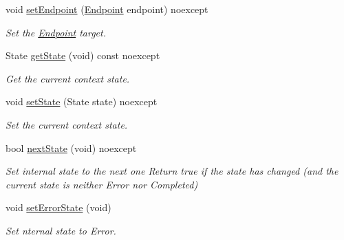 \begin{DoxyCompactItemize}
\mbox{\label{classo_z_1_1_context_ae909982a14c14b62038deff79f9151bb}} 
void \mbox{\hyperlink{classo_z_1_1_context_ae909982a14c14b62038deff79f9151bb}{set\+Endpoint}} (\mbox{\hyperlink{classo_z_1_1_endpoint}{Endpoint}} endpoint) noexcept
\begin{DoxyCompactList}\small\item\em Set the \mbox{\hyperlink{classo_z_1_1_endpoint}{Endpoint}} target. \end{DoxyCompactList}\item 
\mbox{\label{classo_z_1_1_context_af912acc5fa475aa1e835a71df1752ef5}} 
State \mbox{\hyperlink{classo_z_1_1_context_af912acc5fa475aa1e835a71df1752ef5}{get\+State}} (void) const noexcept
\begin{DoxyCompactList}\small\item\em Get the current context\textquotesingle{} state. \end{DoxyCompactList}\item 
\mbox{\label{classo_z_1_1_context_ad64db4a4b4391e8b765338cc227f948b}} 
void \mbox{\hyperlink{classo_z_1_1_context_ad64db4a4b4391e8b765338cc227f948b}{set\+State}} (State state) noexcept
\begin{DoxyCompactList}\small\item\em Set the current context\textquotesingle{} state. \end{DoxyCompactList}\item 
\mbox{\label{classo_z_1_1_context_aa07d51de7059b3a4fc9e3505704a33be}} 
bool \mbox{\hyperlink{classo_z_1_1_context_aa07d51de7059b3a4fc9e3505704a33be}{next\+State}} (void) noexcept
\begin{DoxyCompactList}\small\item\em Set internal state to the next one Return true if the state has changed (and the current state is neither Error nor Completed) \end{DoxyCompactList}\item 
\mbox{\label{classo_z_1_1_context_a036d993634650ee8414c2f12d49d0204}} 
void \mbox{\hyperlink{classo_z_1_1_context_a036d993634650ee8414c2f12d49d0204}{set\+Error\+State}} (void)
\begin{DoxyCompactList}\small\item\em Set nternal state to Error. \end{DoxyCompactList}\item 

\end{DoxyCompactItemize}
